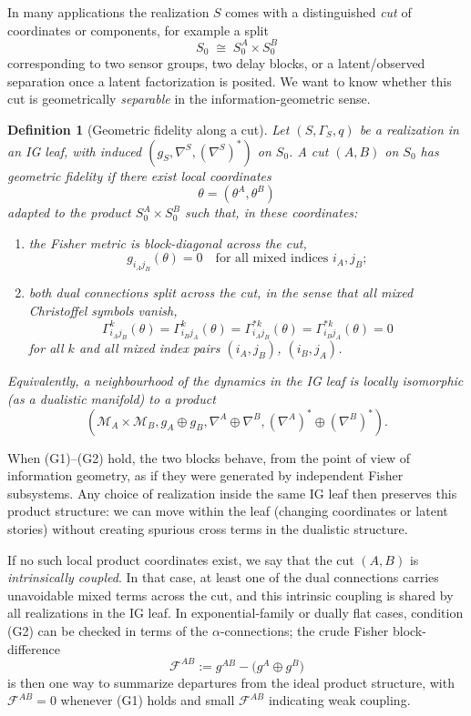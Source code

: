 \documentclass[11pt]{article}
\newtheorem{definition}{Definition}
\newcommand{\1}{\mathbf{1}}
\begin{document}
In many applications the realization $S$ comes with a distinguished \emph{cut} of coordinates or components, for example a split
\[
  S_0 \;\cong\; S_0^A \times S_0^B
\]
corresponding to two sensor groups, two delay blocks, or a latent/observed separation once a latent factorization is posited. We want to know whether this cut is geometrically \emph{separable} in the information-geometric sense.

\begin{definition}[Geometric fidelity along a cut] 
Let $(S,\Gamma_S,q)$ be a realization in an IG leaf, with induced $(g_S,\nabla^S,(\nabla^S)^\ast)$ on $S_0$. A cut $(A,B)$ on $S_0$ has \emph{geometric fidelity} if there exist local coordinates
\[
  \theta = (\theta^A,\theta^B)
\]
adapted to the product $S_0^A\times S_0^B$ such that, in these coordinates:
\begin{enumerate}[label=(G\arabic*),leftmargin=1.8em]
  \item the Fisher metric is block-diagonal across the cut,
  \[
    g_{i_A j_B}(\theta) = 0
    \quad \text{for all mixed indices } i_A,j_B;
  \]
  \item both dual connections split across the cut, in the sense that all mixed Christoffel symbols vanish,
  \[
    \Gamma^{k}_{i_A j_B}(\theta)
    = \Gamma^{k}_{i_B j_A}(\theta)
    = \Gamma^{\ast k}_{i_A j_B}(\theta)
    = \Gamma^{\ast k}_{i_B j_A}(\theta)
    = 0
  \]
  for all $k$ and all mixed index pairs $(i_A,j_B)$, $(i_B,j_A)$.
\end{enumerate}
Equivalently, a neighbourhood of the dynamics in the IG leaf is locally isomorphic (as a dualistic manifold) to a product
\[
  (\mathcal{M}_A \times \mathcal{M}_B,
   g_A \oplus g_B,
   \nabla^A \oplus \nabla^B,
   (\nabla^A)^\ast \oplus (\nabla^B)^\ast).
\]
\end{definition}

When (G1)–(G2) hold, the two blocks behave, from the point of view of information geometry, as if they were generated by independent Fisher subsystems. Any choice of realization inside the same IG leaf then preserves this product structure: we can move within the leaf (changing coordinates or latent stories) without creating spurious cross terms in the dualistic structure.

If no such local product coordinates exist, we say that the cut $(A,B)$ is \emph{intrinsically coupled}. In that case, at least one of the dual connections carries unavoidable mixed terms across the cut, and this intrinsic coupling is shared by all realizations in the IG leaf. In exponential-family or dually flat cases, condition (G2) can be checked in terms of the $\alpha$-connections; the crude Fisher block-difference
\[
  \mathcal{F}^{AB} := g^{AB} - \bigl(g^A \oplus g^B\bigr)
\]
is then one way to summarize departures from the ideal product structure, with $\mathcal{F}^{AB}=0$ whenever (G1) holds and
small $\mathcal{F}^{AB}$ indicating weak coupling.
\end{document}
